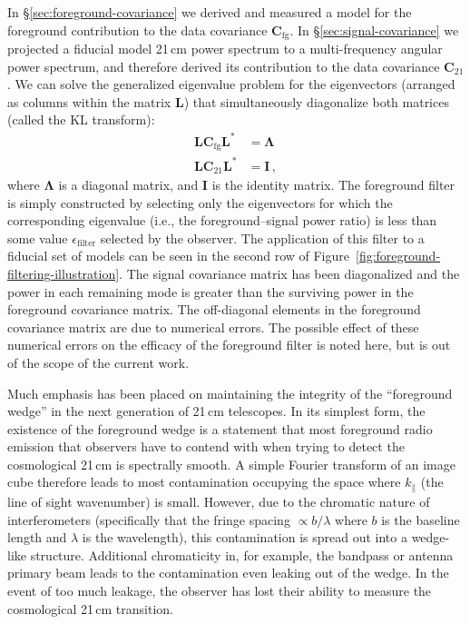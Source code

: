 \documentclass[twocolumn]{aastex62}
\renewcommand{\b}{\pmb}
\begin{document}
In \S\ref{sec:foreground-covariance} we derived and measured a model for the foreground contribution
to the data covariance $\b C_\text{fg}$. In \S\ref{sec:signal-covariance} we projected a fiducial
model 21\,cm power spectrum to a multi-frequency angular power spectrum, and therefore derived its
contribution to the data covariance $\b C_\text{21}$. We can solve the generalized eigenvalue
problem for the eigenvectors (arranged as columns within the matrix $\b L$) that simultaneously
diagonalize both matrices (called the KL transform):
\begin{align}
    \b L\b C_\text{fg}\b L^* &= \b\Lambda \\
    \b L\b C_\text{21}\b L^* &= \b I \,,
\end{align}
where $\b\Lambda$ is a diagonal matrix, and $\b I$ is the identity matrix. The foreground filter is
simply constructed by selecting only the eigenvectors for which the corresponding eigenvalue (i.e.,
the foreground--signal power ratio) is less than some value $\epsilon_\text{filter}$ selected by the
observer. The application of this filter to a fiducial set of models can be seen in the second row
of Figure~\ref{fig:foreground-filtering-illustration}. The signal covariance matrix has been
diagonalized and the power in each remaining mode is greater than the surviving power in the
foreground covariance matrix. The off-diagonal elements in the foreground covariance matrix are due
to numerical errors. The possible effect of these numerical errors on the efficacy of the foreground
filter is noted here, but is out of the scope of the current work.

Much emphasis has been placed on maintaining the integrity of the ``foreground wedge'' in the next
generation of 21\,cm telescopes. In its simplest form, the existence of the foreground wedge is a
statement that most foreground radio emission that observers have to contend with when trying to
detect the cosmological 21\,cm is spectrally smooth. A simple Fourier transform of an image cube
therefore leads to most contamination occupying the space where $k_\parallel$ (the line of sight
wavenumber) is small. However, due to the chromatic nature of interferometers (specifically that the
fringe spacing $\propto b/\lambda$ where $b$ is the baseline length and $\lambda$ is the
wavelength), this contamination is spread out into a wedge-like structure. Additional chromaticity
in, for example, the bandpass or antenna primary beam leads to the contamination even leaking out of
the wedge. In the event of too much leakage, the observer has lost their ability to measure the
cosmological 21\,cm transition.
\end{document}
